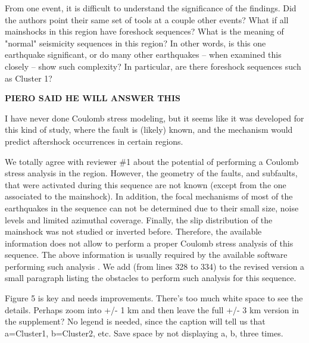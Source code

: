 \documentclass[10pt]{extarticle}
\begin{document}
%
%



\begin{ReviewerComment}{1}
\noindent 
From one event, it is difficult to understand the significance of the findings. Did the authors point their same set of tools at a couple other events? What if all mainshocks in this region have foreshock sequences? What is the meaning of "normal" seismicity sequences in this region? In other words, is this one earthquake significant, or do many other earthquakes -- when examined this closely -- show such complexity? In particular, are there foreshock sequences such as Cluster 1?

\end{ReviewerComment}


\begin{Answer}
\hfill {\bf PIERO SAID HE WILL ANSWER THIS}
 \WorkInProgressRevTask
\end{Answer}
%
%



\begin{ReviewerComment}{1}
\noindent 
I have never done Coulomb stress modeling, but it seems like it was developed for this kind of study, where the fault is (likely) known, and the mechanism would predict aftershock occurrences in certain regions.
\end{ReviewerComment}


\begin{Answer}
We totally agree with reviewer \#1 about the potential of performing a Coulomb stress analysis in the region. However, the geometry of the faults, and subfaults, that were activated during this sequence are not known (except from the one associated to the mainshock). In addition, the focal mechanisms of most of the earthquakes in the sequence can not be determined due to their small size, noise levels and limited azimuthal coverage. Finally, the slip distribution of the mainshock was not studied or inverted before. Therefore, the available information does not allow to perform a proper Coulomb stress analysis of this sequence. The above information is usually required by the available software performing such analysis \citep{toda2011coulomb}. We add (from lines 328 to 334) to the revised version a small paragraph listing the obstacles to perform such analysis for this sequence.
 \WorkInProgressRevTask
\end{Answer}
%
%



\begin{ReviewerComment}{1}
\noindent 
Figure 5 is key and needs improvements. There's too much white space to see the details.  Perhaps zoom into +/- 1 km and then leave the full +/- 3 km version in the supplement? No legend is needed, since the caption will tell us that a=Cluster1, b=Cluster2, etc. Save space by not displaying a, b, three times.
\end{ReviewerComment}
\end{document}
